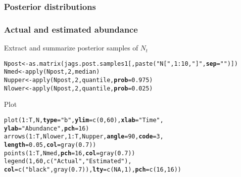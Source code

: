 \documentclass[color=usenames,dvipsnames]{beamer}\usepackage[]{graphicx}\usepackage[]{color}
\makeatletter
\newcommand{\hlnum}[1]{\textcolor[rgb]{0.69,0.494,0}{#1}}%
\newcommand{\hlstr}[1]{\textcolor[rgb]{0.749,0.012,0.012}{#1}}%
\newcommand{\hlopt}[1]{\textcolor[rgb]{0,0,0}{#1}}%
\newcommand{\hlstd}[1]{\textcolor[rgb]{0,0,0}{#1}}%
\newcommand{\hlkwb}[1]{\textcolor[rgb]{0,0.341,0.682}{#1}}%
\newcommand{\hlkwc}[1]{\textcolor[rgb]{0,0,0}{\textbf{#1}}}%
\newcommand{\hlkwd}[1]{\textcolor[rgb]{0.004,0.004,0.506}{#1}}%
\newenvironment{kframe}{%
 \def\at@end@of@kframe{}%
 \ifinner\ifhmode%
  \def\at@end@of@kframe{\end{minipage}}%
  \begin{minipage}{\columnwidth}%
 \fi\fi%
 \def\FrameCommand##1{\hskip\@totalleftmargin \hskip-\fboxsep
 \colorbox{shadecolor}{##1}\hskip-\fboxsep
     \hskip-\linewidth \hskip-\@totalleftmargin \hskip\columnwidth}%
 \MakeFramed {\advance\hsize-\width
   \@totalleftmargin\z@ \linewidth\hsize
   \@setminipage}}%
 {\par\unskip\endMakeFramed%
 \at@end@of@kframe}
\newenvironment{knitrout}{}{} %
\makeatother
\begin{document}
\begin{frame}[fragile]
  \frametitle{Posterior distributions}


\begin{center}
\end{center}
\end{frame}





\begin{frame}[fragile]
  \frametitle{Actual and estimated abundance}
  Extract and summarize posterior samples of $N_t$
\begin{knitrout}\scriptsize
{}\color{fgcolor}\begin{kframe}
\begin{alltt}
\hlstd{Npost} \hlkwb{<-} \hlkwd{as.matrix}\hlstd{(jags.post.samples1[,}\hlkwd{paste}\hlstd{(}\hlstr{"N["}\hlstd{,} \hlnum{1}\hlopt{:}\hlnum{10}\hlstd{,} \hlstr{"]"}\hlstd{,} \hlkwc{sep}\hlstd{=}\hlstr{""}\hlstd{)])}
\hlstd{Nmed} \hlkwb{<-} \hlkwd{apply}\hlstd{(Npost,} \hlnum{2}\hlstd{, median)}
\hlstd{Nupper} \hlkwb{<-} \hlkwd{apply}\hlstd{(Npost,} \hlnum{2}\hlstd{, quantile,} \hlkwc{prob}\hlstd{=}\hlnum{0.975}\hlstd{)}
\hlstd{Nlower} \hlkwb{<-} \hlkwd{apply}\hlstd{(Npost,} \hlnum{2}\hlstd{, quantile,} \hlkwc{prob}\hlstd{=}\hlnum{0.025}\hlstd{)}
\end{alltt}
\end{kframe}
\end{knitrout}
  \pause
  \vfill
  Plot
\begin{knitrout}\scriptsize
{}\color{fgcolor}\begin{kframe}
\begin{alltt}
\hlkwd{plot}\hlstd{(}\hlnum{1}\hlopt{:}\hlstd{T, N,} \hlkwc{type}\hlstd{=}\hlstr{"b"}\hlstd{,} \hlkwc{ylim}\hlstd{=}\hlkwd{c}\hlstd{(}\hlnum{0}\hlstd{,} \hlnum{60}\hlstd{),} \hlkwc{xlab}\hlstd{=}\hlstr{"Time"}\hlstd{,}
     \hlkwc{ylab}\hlstd{=}\hlstr{"Abundance"}\hlstd{,} \hlkwc{pch}\hlstd{=}\hlnum{16}\hlstd{)}
\hlkwd{arrows}\hlstd{(}\hlnum{1}\hlopt{:}\hlstd{T, Nlower,} \hlnum{1}\hlopt{:}\hlstd{T, Nupper,} \hlkwc{angle}\hlstd{=}\hlnum{90}\hlstd{,} \hlkwc{code}\hlstd{=}\hlnum{3}\hlstd{,}
       \hlkwc{length}\hlstd{=}\hlnum{0.05}\hlstd{,} \hlkwc{col}\hlstd{=}\hlkwd{gray}\hlstd{(}\hlnum{0.7}\hlstd{))}
\hlkwd{points}\hlstd{(}\hlnum{1}\hlopt{:}\hlstd{T, Nmed,} \hlkwc{pch}\hlstd{=}\hlnum{16}\hlstd{,} \hlkwc{col}\hlstd{=}\hlkwd{gray}\hlstd{(}\hlnum{0.7}\hlstd{))}
\hlkwd{legend}\hlstd{(}\hlnum{1}\hlstd{,} \hlnum{60}\hlstd{,} \hlkwd{c}\hlstd{(}\hlstr{"Actual"}\hlstd{,} \hlstr{"Estimated"}\hlstd{),}
       \hlkwc{col}\hlstd{=}\hlkwd{c}\hlstd{(}\hlstr{"black"}\hlstd{,} \hlkwd{gray}\hlstd{(}\hlnum{0.7}\hlstd{)),} \hlkwc{lty}\hlstd{=}\hlkwd{c}\hlstd{(}\hlnum{NA}\hlstd{,}\hlnum{1}\hlstd{),} \hlkwc{pch}\hlstd{=}\hlkwd{c}\hlstd{(}\hlnum{16}\hlstd{,}\hlnum{16}\hlstd{))}
\end{alltt}
\end{kframe}
\end{knitrout}
\end{frame}
\end{document}
